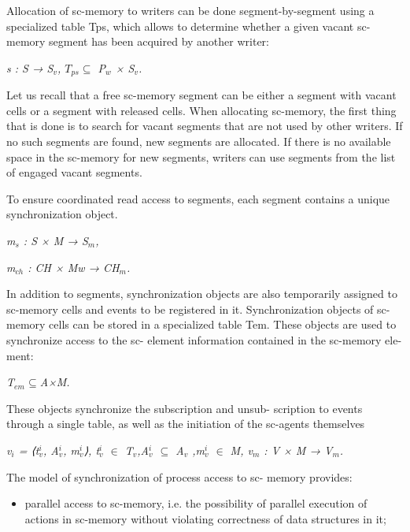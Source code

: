 \documentclass[10pt, a4paper]{article}
\begin{document}
\begin{multicols}{2}
 Allocation of sc-memory to writers can be done segment-by-segment using a specialized table Tps, which allows to determine whether a given vacant sc-memory segment has been acquired by another writer:

 \begin{center}
    \textit{s : S → S$_{v}$, $T_{ps} \subseteq$ P$_{w}$ × S$_{v}$.}
\end{center}

Let us recall that a free sc-memory segment can be either a segment with vacant cells or a segment with released cells. When allocating sc-memory, the first thing that is done is to search for vacant segments that are not used by other writers.
If no such segments are found, new segments are allocated. If there is no available space in the sc-memory for new segments, writers can use segments from the list of engaged vacant segments.

To ensure coordinated read access to segments, each segment contains a unique synchronization object.
\begin{center}
    \textit{m$_{s}$ : S × M → S$_{m}$,}
\end{center}
\begin{center}
    \textit{m$_{ch}$ : CH × Mw → CH$_{m}$.}
\end{center}

In addition to segments, synchronization objects are also temporarily assigned to sc-memory cells and events to be registered in it. Synchronization objects of sc- memory cells can be stored in a specialized table Tem. These objects are used to synchronize access to the sc- element information contained in the sc-memory ele- ment:
\begin{center}
    \textit{T$_{em} \subseteq$A×M.}
\end{center}

These objects synchronize the subscription and unsub- scription to events through a single table, as well as the initiation of the sc-agents themselves

\begin{center}
\textit{v$_{i}$ = ⟨t$^ i_{v}$, A$^i_{v}$, m$^i_{v}$⟩, t$^i_{v}$ $\in$ T$_{v}$,A$^i_{v}$ $\subseteq$ A$_{v}$ ,m$^i_{v}$ $\in$ M, v$_{m}$ : V × M → V$_{m}$.}
\end{center}

The model of synchronization of process access to sc- memory provides:

\begin{itemize}
    \item parallel access to sc-memory, i.e. the possibility of parallel execution of actions in sc-memory without violating correctness of data structures in it;
\end{itemize}

\end{multicols}
\end{document}
